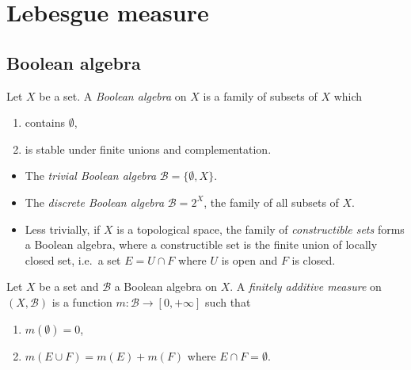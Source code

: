 \documentclass[a4paper]{article}
\begin{document}


\tableofcontents

\section{Lebesgue measure}

\subsection{Boolean algebra}

\begin{definition}
  Let \(X\) be a set. A \emph{Boolean algebra} on \(X\) is a family of subsets of \(X\) which
  \begin{enumerate}
  \item contains \(\emptyset\),
  \item is stable under finite unions and complementation.
  \end{enumerate}
\end{definition}

\begin{eg}\leavevmode
  \begin{itemize}
  \item The \emph{trivial Boolean algebra} \(\mathcal B = \{\emptyset, X\}\).
  \item The \emph{discrete Boolean algebra} \(\mathcal B = 2^X\), the family of all subsets of \(X\).
  \item Less trivially, if \(X\) is a topological space, the family of \emph{constructible sets} forms a Boolean algebra, where a constructible set is the finite union of locally closed set, i.e.\ a set \(E = U \cap F\) where \(U\) is open and \(F\) is closed.
  \end{itemize}
\end{eg}

\begin{definition}
  Let \(X\) be a set and \(\mathcal B\) a Boolean algebra on \(X\). A \emph{finitely additive measure} on \((X, \mathcal B)\) is a function \(m: \mathcal B \to [0, +\infty]\) such that
  \begin{enumerate}
  \item \(m(\emptyset) = 0\),
  \item \(m(E \cup F) = m(E) + m(F)\) where \(E \cap F = \emptyset\).
  \end{enumerate}
\end{definition}
\end{document}
